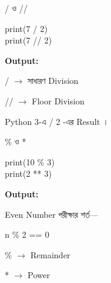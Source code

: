 \noindent
\begin{minipage}[t]{0.49\linewidth}

\begin{sideexamplebox}{\textenglish{\ttfamily /} ও \textenglish{\ttfamily //}}

\begin{sidecodebox}
\begin{english}
\ttfamily
print(7 / 2)\\
print(7 // 2)
\end{english}
\end{sidecodebox}

\textbf{Output:}

\begin{center}
\textenglish{}
\qquad
\textenglish{}
\end{center}

\textenglish{\ttfamily /}
\(\longrightarrow\)
সাধারণ Division

\medskip

\textenglish{\ttfamily //}
\(\longrightarrow\)
Floor Division

\medskip

Python 3-এ
\textenglish{ / 2}
-এর Result
\textenglish{}।

\end{sideexamplebox}

\end{minipage}
\hfill
\begin{minipage}[t]{0.49\linewidth}

\begin{sideexamplebox}{\textenglish{\ttfamily \%} ও \textenglish{\ttfamily **}}

\begin{sidecodebox}
\begin{english}
\ttfamily
print(10 \% 3)\\
print(2 ** 3)
\end{english}
\end{sidecodebox}

\textbf{Output:}

\begin{center}
\textenglish{}
\qquad
\textenglish{}
\end{center}

Even Number পরীক্ষার শর্ত—

\begin{sidecodebox}
\begin{english}
\ttfamily
n \% 2 == 0
\end{english}
\end{sidecodebox}

\textenglish{\ttfamily \%}
\(\longrightarrow\)
Remainder

\medskip

\textenglish{\ttfamily **}
\(\longrightarrow\)
Power

\end{sideexamplebox}

\end{minipage}

